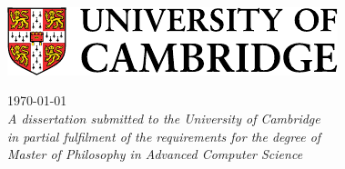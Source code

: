 \begin{sffamily}
\begin{titlepage}

\makeatletter
\begin{center}
\noindent
\huge
\@title \\
\end{center}

\begin{center}
\noindent
\huge
\@author \\
\Large
\college \\[24pt]
\includegraphics{images/logo-notext-colour.pdf}
\end{center}

\vspace{24pt}

\begin{center}
\noindent
\large
{
    \today \\
    \vspace{0.5em}
    \it A dissertation submitted to the University of Cambridge \\
in partial fulfilment of the requirements for the degree of \\
Master of Philosophy in Advanced Computer Science
}
\end{center}

\end{titlepage}
\end{sffamily}
\makeatother







